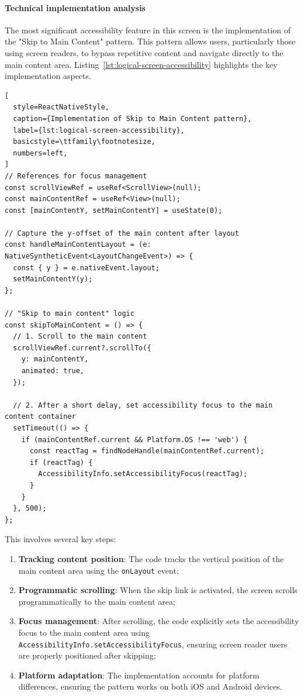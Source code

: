 \paragraph{Technical implementation analysis}

The most significant accessibility feature in this screen is the implementation of the "Skip to Main Content" pattern. This pattern allows users, particularly those using screen readers, to bypass repetitive content and navigate directly to the main content area. Listing~\ref{lst:logical-screen-accessibility} highlights the key implementation aspects.

\begin{lstlisting}[
  style=ReactNativeStyle,
  caption={Implementation of Skip to Main Content pattern},
  label={lst:logical-screen-accessibility},
  basicstyle=\ttfamily\footnotesize,
  numbers=left,
]
// References for focus management
const scrollViewRef = useRef<ScrollView>(null);
const mainContentRef = useRef<View>(null);
const [mainContentY, setMainContentY] = useState(0);

// Capture the y-offset of the main content after layout
const handleMainContentLayout = (e: NativeSyntheticEvent<LayoutChangeEvent>) => {
  const { y } = e.nativeEvent.layout;
  setMainContentY(y);
};

// "Skip to main content" logic
const skipToMainContent = () => {
  // 1. Scroll to the main content
  scrollViewRef.current?.scrollTo({
    y: mainContentY,
    animated: true,
  });

  // 2. After a short delay, set accessibility focus to the main content container
  setTimeout(() => {
    if (mainContentRef.current && Platform.OS !== 'web') {
      const reactTag = findNodeHandle(mainContentRef.current);
      if (reactTag) {
        AccessibilityInfo.setAccessibilityFocus(reactTag);
      }
    }
  }, 500);
};
\end{lstlisting}
\FloatBarrier

This involves several key steps:

\begin{enumerate}
    \item \textbf{Tracking content position}: The code tracks the vertical position of the main content area using the \texttt{onLayout} event;
    
    \item \textbf{Programmatic scrolling}: When the skip link is activated, the screen scrolls programmatically to the main content area;
    
    \item \textbf{Focus management}: After scrolling, the code explicitly sets the accessibility focus to the main content area using \texttt{AccessibilityInfo.setAccessibilityFocus}, ensuring screen reader users are properly positioned after skipping;
    
    \item \textbf{Platform adaptation}: The implementation accounts for platform differences, ensuring the pattern works on both iOS and Android devices.
\end{enumerate}

